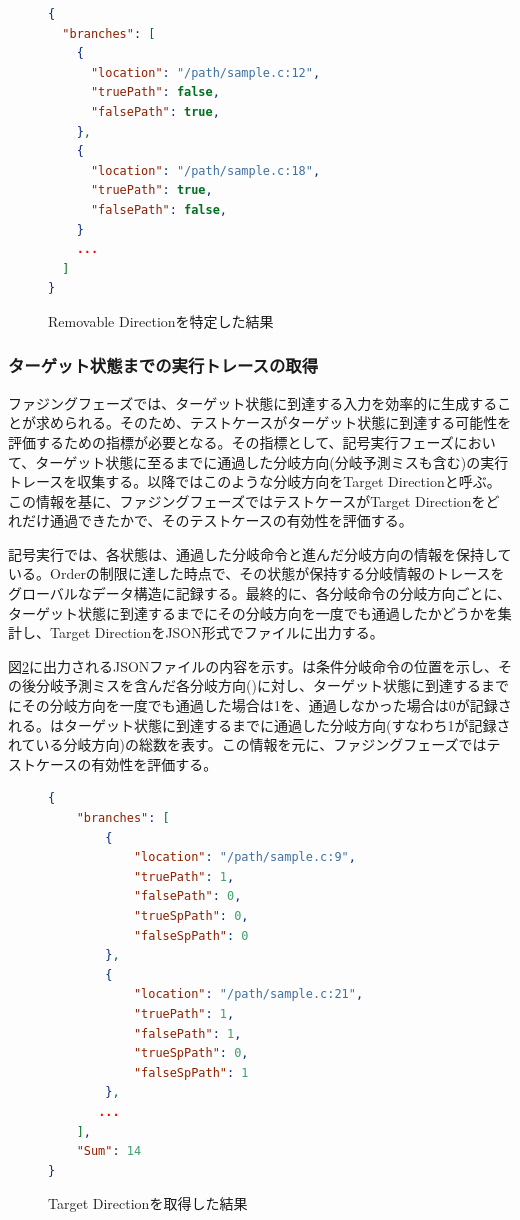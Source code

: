 \begin{figure}
  \begin{lstlisting}[language=json]
{
  "branches": [
    {
      "location": "/path/sample.c:12",
      "truePath": false,
      "falsePath": true,
    },
    {
      "location": "/path/sample.c:18",
      "truePath": true,
      "falsePath": false,
    }
    ...
  ]
}
  \end{lstlisting}
  \caption{Removable Directionを特定した結果}
  \label{Unnecessary_branch_result}
\end{figure}


\subsubsection{ターゲット状態までの実行トレースの取得}
ファジングフェーズでは、ターゲット状態に到達する入力を効率的に生成することが求められる。そのため、テストケースがターゲット状態に到達する可能性を評価するための指標が必要となる。その指標として、記号実行フェーズにおいて、ターゲット状態に至るまでに通過した分岐方向(分岐予測ミスも含む)の実行トレースを収集する。以降ではこのような分岐方向をTarget Directionと呼ぶ。この情報を基に、ファジングフェーズではテストケースがTarget Directionをどれだけ通過できたかで、そのテストケースの有効性を評価する。\par

記号実行では、各状態は、通過した分岐命令と進んだ分岐方向の情報を保持している。Orderの制限に達した時点で、その状態が保持する分岐情報のトレースをグローバルなデータ構造に記録する。最終的に、各分岐命令の分岐方向ごとに、ターゲット状態に到達するまでにその分岐方向を一度でも通過したかどうかを集計し、Target DirectionをJSON形式でファイルに出力する。\par

図\ref{Execution_Trace}に出力されるJSONファイルの内容を示す。は条件分岐命令の位置を示し、その後分岐予測ミスを含んだ各分岐方向()に対し、ターゲット状態に到達するまでにその分岐方向を一度でも通過した場合は1を、通過しなかった場合は0が記録される。はターゲット状態に到達するまでに通過した分岐方向(すなわち1が記録されている分岐方向)の総数を表す。この情報を元に、ファジングフェーズではテストケースの有効性を評価する。\par

\begin{figure}
  \begin{lstlisting}[language=json]
{
    "branches": [
        {
            "location": "/path/sample.c:9",
            "truePath": 1,
            "falsePath": 0,
            "trueSpPath": 0,
            "falseSpPath": 0
        },
        {
            "location": "/path/sample.c:21",
            "truePath": 1,
            "falsePath": 1,
            "trueSpPath": 0,
            "falseSpPath": 1
        },
       ...
    ],
    "Sum": 14
}
  \end{lstlisting}
  \caption{Target Directionを取得した結果}
  \label{Execution_Trace}
\end{figure}

